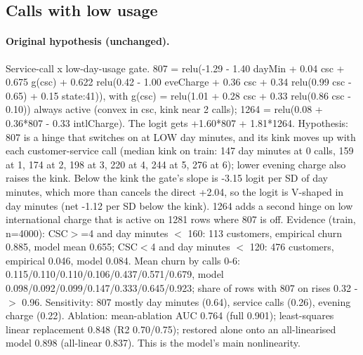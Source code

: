 \documentclass[a4paper,10pt]{article}
\newif\ifreviewmarks
\newcommand{\reviewrule}{\noindent{\color{BrickRed}\rule{\linewidth}{0.8pt}}}
\newenvironment{drafted}[1][]{%
  \ifreviewmarks\par\addvspace{\medskipamount}\reviewrule\par\nopagebreak
  \noindent{\color{BrickRed}\sffamily\footnotesize\textbf{Thesis Draft}\quad #1\hfill review}\par\nopagebreak\smallskip\fi}{%
  \ifreviewmarks\par\smallskip\noindent{\color{BrickRed}\sffamily\footnotesize end of thesis draft}\par\nopagebreak\reviewrule\par\medskip\fi}
\begin{document}
\begin{drafted}[plain-language layer: churn100-s2-c1]
\subsection{Calls with low usage}\label{tech:ann91}
\paragraph{Original hypothesis (unchanged).} Service-call x low-day-usage gate. 807 = relu(-1.29 - 1.40 dayMin + 0.04 csc + 0.675 g(csc) + 0.622 relu(0.42 - 1.00 eveCharge + 0.36 csc + 0.34 relu(0.99 csc - 0.65) + 0.15 state:41)), with g(csc) = relu(1.01 + 0.28 csc + 0.33 relu(0.86 csc - 0.10)) always active (convex in csc, kink near 2 calls); 1264 = relu(0.08 + 0.36*807 - 0.33 intlCharge). The logit gets +1.60*807 + 1.81*1264. Hypothesis: 807 is a hinge that switches on at LOW day minutes, and its kink moves up with each customer-service call (median kink on train: 147 day minutes at 0 calls, 159 at 1, 174 at 2, 198 at 3, 220 at 4, 244 at 5, 276 at 6); lower evening charge also raises the kink. Below the kink the gate's slope is -3.15 logit per SD of day minutes, which more than cancels the direct +2.04, so the logit is V-shaped in day minutes (net -1.12 per SD below the kink). 1264 adds a second hinge on low international charge that is active on 1281 rows where 807 is off. Evidence (train, n=4000): CSC$>$=4 and day minutes $<$ 160: 113 customers, empirical churn 0.885, model mean 0.655; CSC$<$4 and day minutes $<$ 120: 476 customers, empirical 0.046, model 0.084. Mean churn by calls 0-6: 0.115/\allowbreak{}0.110/\allowbreak{}0.110/\allowbreak{}0.106/\allowbreak{}0.437/\allowbreak{}0.571/\allowbreak{}0.679,\allowbreak{} model 0.098/\allowbreak{}0.092/\allowbreak{}0.099/\allowbreak{}0.147/\allowbreak{}0.333/\allowbreak{}0.645/\allowbreak{}0.923;\allowbreak{} share of rows with 807 on rises 0.32 -$>$ 0.96. Sensitivity: 807 mostly day minutes (0.64), service calls (0.26), evening charge (0.22). Ablation: mean-ablation AUC 0.764 (full 0.901); least-squares linear replacement 0.848 (R2 0.70/0.75); restored alone onto an all-linearised model 0.898 (all-linear 0.837). This is the model's main nonlinearity.

\end{drafted}
\end{document}
